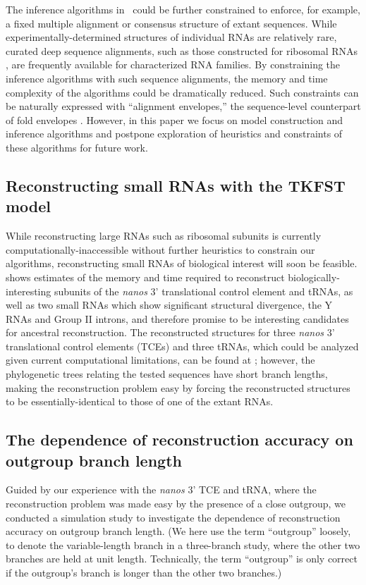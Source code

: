 \documentclass[10pt]{article}
\begin{document}
The inference algorithms in \indiegram\ could be further constrained
to enforce, for example, a fixed multiple alignment or consensus
structure of extant sequences.  While experimentally-determined
structures of individual RNAs are relatively rare, curated deep sequence
alignments, such as those constructed for ribosomal RNAs
\cite{Gutell93}, are frequently available for characterized RNA families.  By constraining the
inference algorithms with such sequence alignments, the memory and
time complexity of the algorithms could be dramatically reduced.  Such
constraints can be naturally expressed with ``alignment envelopes,''
the sequence-level counterpart of fold envelopes \cite{Holmes2005}.
However, in this paper we focus on model construction and inference
algorithms and postpone exploration of heuristics and constraints of
these algorithms for future work.


\subsection*{Reconstructing small RNAs with the TKFST model}

While reconstructing large RNAs such as ribosomal subunits is
currently computationally-inaccessible without further heuristics to
constrain our algorithms, reconstructing small RNAs of biological
interest will soon be feasible.
 shows estimates of the memory and time required
to reconstruct biologically-interesting subunits of 
the \emph{nanos} 3' translational control element and tRNAs,
as well as two small RNAs which show significant structural
divergence, the Y RNAs and Group II introns, and therefore promise to be
interesting candidates for ancestral reconstruction.
The reconstructed structures for three \emph{nanos} 3'
translational control elements (TCEs) and three tRNAs, which could be
analyzed given current computational limitations, can be found at
\indiegramurl; however, the phylogenetic trees relating the tested
sequences have short branch lengths, making the reconstruction problem easy by forcing the reconstructed structures to
be essentially-identical to those of one of the extant RNAs.


\subsection*{The dependence of reconstruction accuracy on outgroup
  branch length}

Guided by our experience with the \emph{nanos} 3' TCE and tRNA, where
the reconstruction problem was made easy by the presence of a close
outgroup, we conducted a simulation study to investigate the
dependence of reconstruction accuracy on outgroup branch length.
(We here use the term ``outgroup'' loosely, to denote the variable-length branch in a three-branch study,
where the other two branches are held at unit length.
Technically, the term ``outgroup'' is only correct if the outgroup's branch is longer than the other two branches.)
\end{document}
